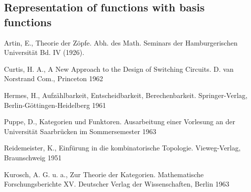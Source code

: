 \documentclass{article}
\begin{document}
\subsection{Representation of functions with basis functions}
\label{basis-function-representation}

\begin{thebibliography}{9}
Artin, E., Theorie der Zöpfe. Abh. des Math. Seminars der Hamburgerischen Universit\"{a}t Bd. IV (1926).

Curtis, H. A., A New Approach to the Design of Switching Circuits. D. van Norstrand Com., Princeton 1962

Hermes, H., Aufz\"{a}hlbarkeit, Entscheidbarkeit, Berechenbarkeit. Springer-Verlag, Berlin-G\"{o}ttingen-Heidelberg 1961

Puppe, D., Kategorien und Funktoren. Ausarbeitung einer Vorlesung an der Universit\"{a}t Saarbr\"{u}cken im Sommersemester 1963

Reidemeister, K., Einf\"{u}rung in die kombinatorische Topologie. Vieweg-Verlag, Braunschweig 1951

Kurosch, A. G. u. a., Zur Theorie der Kategorien. Mathematische Forschungsberichte XV. Deutscher Verlag der Wissenschaften, Berlin 1963
\end{thebibliography}
\end{document}
